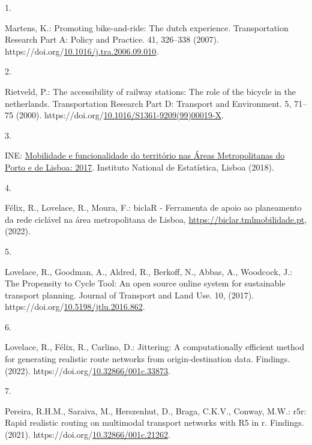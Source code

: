 \documentclass[runningheads]{llncs}
\newlength{\cslhangindent}
\newlength{\csllabelwidth}
\newenvironment{CSLReferences}[2] %
 {\begin{list}{}{%
  \setlength{\itemindent}{0pt}
  \setlength{\leftmargin}{0pt}
  \setlength{\parsep}{0pt}
  \ifodd #1
   \setlength{\leftmargin}{\cslhangindent}
   \setlength{\itemindent}{-1\cslhangindent}
  \fi
  \setlength{\itemsep}{#2\baselineskip}}}
 {\end{list}}
\newcommand{\CSLLeftMargin}[1]{\parbox[t]{\csllabelwidth}{#1}}
\newcommand{\CSLRightInline}[1]{\parbox[t]{\linewidth - \csllabelwidth}{#1}\break}
\begin{document}
\label{refs}
\begin{CSLReferences}{0}{0}
\CSLLeftMargin{1. }%
\CSLRightInline{Martens, K.: Promoting bike-and-ride: The dutch
experience. Transportation Research Part A: Policy and Practice. 41,
326--338 (2007).
https://doi.org/\href{https://doi.org/10.1016/j.tra.2006.09.010}{10.1016/j.tra.2006.09.010}.}

\CSLLeftMargin{2. }%
\CSLRightInline{Rietveld, P.: The accessibility of railway stations: The
role of the bicycle in the netherlands. Transportation Research Part D:
Transport and Environment. 5, 71--75 (2000).
https://doi.org/\href{https://doi.org/10.1016/S1361-9209(99)00019-X}{10.1016/S1361-9209(99)00019-X}.}

\CSLLeftMargin{3. }%
\CSLRightInline{INE:
\href{https://www.ine.pt/xportal/xmain?xpid=INE&xpgid=ine_publicacoes&PUBLICACOESpub_boui=349495406&PUBLICACOESmodo=2&xlang=pt}{Mobilidade
e funcionalidade do território nas {Áreas Metropolitanas do Porto e de
Lisboa}: 2017}. {Instituto National de Estatística}, Lisboa (2018).}

\CSLLeftMargin{4. }%
\CSLRightInline{Félix, R., Lovelace, R., Moura, F.: {biclaR - Ferramenta
de apoio ao planeamento da rede ciclável na área metropolitana de
Lisboa}, \url{https://biclar.tmlmobilidade.pt}, (2022).}

\CSLLeftMargin{5. }%
\CSLRightInline{Lovelace, R., Goodman, A., Aldred, R., Berkoff, N.,
Abbas, A., Woodcock, J.: The Propensity to Cycle Tool: An open source
online system for sustainable transport planning. Journal of Transport
and Land Use. 10, (2017).
https://doi.org/\href{https://doi.org/10.5198/jtlu.2016.862}{10.5198/jtlu.2016.862}.}

\CSLLeftMargin{6. }%
\CSLRightInline{Lovelace, R., Félix, R., Carlino, D.: Jittering: A
computationally efficient method for generating realistic route networks
from origin-destination data. Findings. (2022).
https://doi.org/\href{https://doi.org/10.32866/001c.33873}{10.32866/001c.33873}.}

\CSLLeftMargin{7. }%
\CSLRightInline{Pereira, R.H.M., Saraiva, M., Herszenhut, D., Braga,
C.K.V., Conway, M.W.: r5r: Rapid realistic routing on multimodal
transport networks with R5 in r. Findings. (2021).
https://doi.org/\href{https://doi.org/10.32866/001c.21262}{10.32866/001c.21262}.}


\end{CSLReferences}
\end{document}
